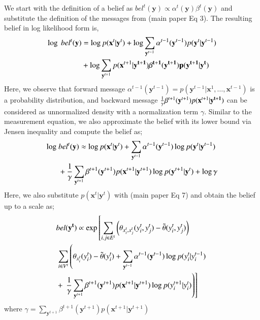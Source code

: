 We start with the definition of a belief as \mbox{$bel^t(\mathbf{y}) \propto  \alpha^t(\mathbf{y}) \beta^t(\mathbf{y})$} and substitute the definition of the messages from (main paper Eq 3). The resulting belief in log likelihood form is,
\begin{equation}\small
\begin{aligned}
\log~bel^t(\mathbf{y}) &= \log p(\mathbf{x}^t|\mathbf{y}^t) + \log \sum_{\mathbf{y}^{t-1}} \alpha^{t-1}(\mathbf{y}^{t-1}) p(\mathbf{y}^{t}|\mathbf{y}^{t-1}) \\
&+ \log \sum_{\mathbf{y}^{t+1}} p(\mathbf{x}^{t+1}|\bf{y}^{t+1}) \beta^{t+1}(\mathbf{y}^{t+1}) p(\mathbf{y}^{t+1}|\mathbf{y}^{t})
\end{aligned}
\end{equation}
Here, we observe that forward message \mbox{$\alpha^{t-1}(\mathbf{y}^{t-1})=p(\mathbf{y}^{t-1}|\mathbf{x}^{1},\ldots,\mathbf{x}^{t-1})$} is a probability distribution, and backward message $\frac{1}{\gamma} \beta^{t+1} (\mathbf{y}^{t+1})  p(\mathbf{x}^{t+1}|\bf{y}^{t+1})$ can be considered as unnormalized density with a normalization term $\gamma$. Similar to the measurement equation, we also approximate the belief with its lower bound via Jensen inequality and compute the belief as;
\begin{equation}\small
  \begin{aligned}
\log~&bel^t(\mathbf{y}) \approx \log p(\mathbf{x}^t|\mathbf{y}^t) + \sum_{\mathbf{y}^{t-1}} \alpha^{t-1}(\mathbf{y}^{t-1}) \log p(\mathbf{y}^{t}|\mathbf{y}^{t-1}) \\
&+ \frac{1}{\gamma}\sum_{\mathbf{y}^{t+1}}\beta^{t+1}(\mathbf{y}^{t+1}) p(\mathbf{x}^{t+1}|\mathbf{y}^{t+1}) \log p(\mathbf{y}^{t+1}|\mathbf{y}^{t})+\log{\gamma}
\end{aligned}
\end{equation}
Here, we also substitute $p(\mathbf{x}^t|\mathbf{y}^t)$ with (main paper Eq 7) and obtain the belief up to a scale as;
\begin{equation}\small
  \begin{aligned}
&bel(\mathbf{y^t}) \propto \exp\left[  \sum_{i,j \in E^t} \left( \theta_{x^t_i,x^t_j}(y^t_i,y^t_j) - \tilde{\theta}(y^t_i,y^t_j) \right) \right. \\
&\left. \sum_{i \in V^t} \left( \theta_{x^t_i}(y^t_i) - \tilde{\theta}(y^t_i) +  \sum_{\mathbf{y}^{t-1}} \alpha^{t-1}(\mathbf{y}^{t-1}) \log p(y^t_i|y^{t-1}_i) \right. \right. \\
&+\left.\left.\frac{1}{\gamma}\sum_{\mathbf{y}^{t+1}} \beta^{t+1}(\mathbf{y}^{t+1}) p(\mathbf{x}^{t+1}|\mathbf{y}^{t+1}) \log p(y^{t+1}_i|y^{t}_i) \right) \right]
\end{aligned}
\label{crfbelief}
\end{equation}
where $\gamma=\sum_{\mathbf{y}^{t+1}} \beta^{t+1}(\mathbf{y}^{t+1}) p(\mathbf{x}^{t+1}|\mathbf{y}^{t+1})$
